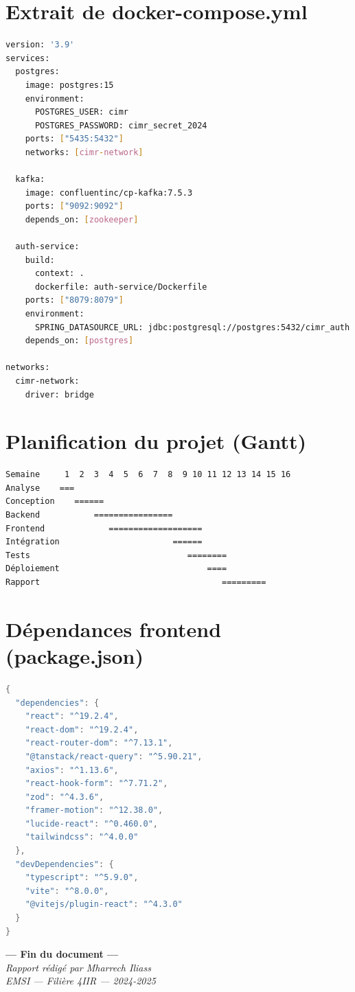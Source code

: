\documentclass[12pt,a4paper,oneside]{report}
\begin{document}
\section{Extrait de docker-compose.yml}
\begin{lstlisting}[language=bash]
version: '3.9'
services:
  postgres:
    image: postgres:15
    environment:
      POSTGRES_USER: cimr
      POSTGRES_PASSWORD: cimr_secret_2024
    ports: ["5435:5432"]
    networks: [cimr-network]

  kafka:
    image: confluentinc/cp-kafka:7.5.3
    ports: ["9092:9092"]
    depends_on: [zookeeper]

  auth-service:
    build:
      context: .
      dockerfile: auth-service/Dockerfile
    ports: ["8079:8079"]
    environment:
      SPRING_DATASOURCE_URL: jdbc:postgresql://postgres:5432/cimr_auth
    depends_on: [postgres]

networks:
  cimr-network:
    driver: bridge
\end{lstlisting}

\section{Planification du projet (Gantt)}
\begin{lstlisting}
Semaine     1  2  3  4  5  6  7  8  9 10 11 12 13 14 15 16
Analyse    ===
Conception    ======
Backend           ================
Frontend             ===================
Intégration                       ======
Tests                                ========
Déploiement                              ====
Rapport                                     =========
\end{lstlisting}

\section{Dépendances frontend (package.json)}
\begin{lstlisting}[language=Java]
{
  "dependencies": {
    "react": "^19.2.4",
    "react-dom": "^19.2.4",
    "react-router-dom": "^7.13.1",
    "@tanstack/react-query": "^5.90.21",
    "axios": "^1.13.6",
    "react-hook-form": "^7.71.2",
    "zod": "^4.3.6",
    "framer-motion": "^12.38.0",
    "lucide-react": "^0.460.0",
    "tailwindcss": "^4.0.0"
  },
  "devDependencies": {
    "typescript": "^5.9.0",
    "vite": "^8.0.0",
    "@vitejs/plugin-react": "^4.3.0"
  }
}
\end{lstlisting}



\vspace{2cm}
\begin{center}
\textbf{--- Fin du document ---}\\[0.5cm]
\textit{Rapport rédigé par Mharrech Iliass}\\
\textit{EMSI --- Filière 4IIR --- 2024-2025}
\end{center}
\end{document}
